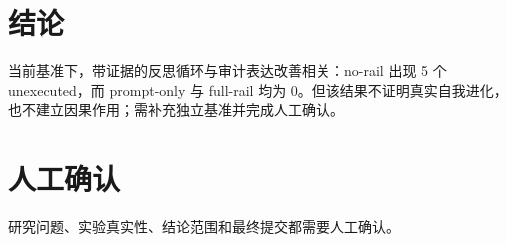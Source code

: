 \documentclass[UTF8]{ctexart}
\begin{document}
\section{结论}
当前基准下，带证据的反思循环与审计表达改善相关：no-\allowbreak{}rail 出现 5 个 unexecuted，而 prompt-\allowbreak{}only 与 full-\allowbreak{}rail 均为 0。但该结果不证明真实自我进化，也不建立因果作用；需补充独立基准并完成人工确认。
\section{人工确认}
研究问题、实验真实性、结论范围和最终提交都需要人工确认。
\end{document}
